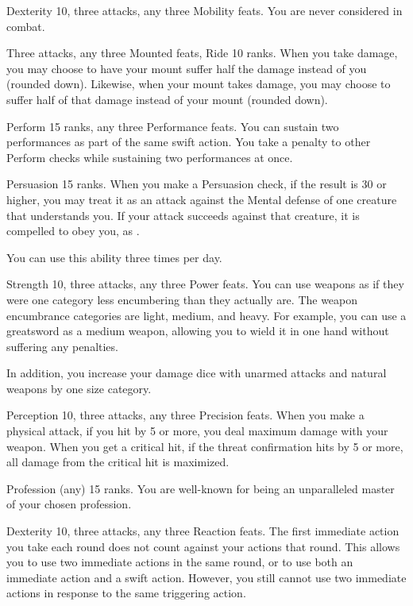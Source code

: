 \featpres Dexterity 10, three attacks, any three Mobility feats.
\featben You are never considered \engaged in combat.

\featpres Three attacks, any three Mounted feats, Ride 10 ranks.
\featben When you take damage, you may choose to have your mount suffer half the damage instead of you (rounded down).
Likewise, when your mount takes damage, you may choose to suffer half of that damage instead of your mount (rounded down).

\featpres Perform 15 ranks, any three Performance feats.
\featben You can sustain two performances as part of the same swift action.
You take a  penalty to other Perform checks while sustaining two performances at once.

\featpre Persuasion 15 ranks.
\featben When you make a Persuasion check, if the result is 30 or higher, you may treat it as an attack against the Mental defense of one creature that understands you.
If your attack succeeds against that creature, it is compelled to obey you, as .

You can use this ability three times per day.

\featpres Strength 10, three attacks, any three Power feats.
\featben You can use weapons as if they were one category less encumbering than they actually are.
The weapon encumbrance categories are light, medium, and heavy.
For example, you can use a greatsword as a medium weapon, allowing you to wield it in one hand without suffering any penalties.

In addition, you increase your damage dice with unarmed attacks and natural weapons by one size category.

\featpres Perception 10, three attacks, any three Precision feats.
\featben When you make a physical attack, if you hit by 5 or more, you deal maximum damage with your weapon.
When you get a critical hit, if the threat confirmation hits by 5 or more, all damage from the critical hit is maximized.

\featpre Profession (any) 15 ranks.
\featben You are well-known for being an unparalleled master of your chosen profession.

\featpres Dexterity 10, three attacks, any three Reaction feats.
\featben The first immediate action you take each round does not count against your actions that round.
This allows you to use two immediate actions in the same round, or to use both an immediate action and a swift action.
However, you still cannot use two immediate actions in response to the same triggering action.

